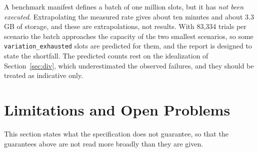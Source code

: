 \documentclass[11pt]{article}
\theoremstyle{definition}
\theoremstyle{remark}
\newcommand{\code}[1]{\texttt{#1}}
\begin{document}
A benchmark manifest defines a batch of one million slots, but it has \emph{not been executed}. Extrapolating the measured rate gives about ten minutes and about 3.3 GB of storage, and these are extrapolations, not results. With 83,334 trials per scenario the batch approaches the capacity of the two smallest scenarios, so some \code{variation\_exhausted} slots are predicted for them, and the report is designed to state the shortfall. The predicted counts rest on the idealization of Section~\ref{sec:div}, which underestimated the observed failures, and they should be treated as indicative only.

\section{Limitations and Open Problems}\label{sec:limits}

This section states what the specification does not guarantee, so that the guarantees above are not read more broadly than they are given.
\end{document}
